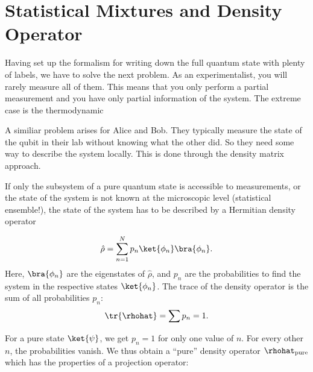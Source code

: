 \section{Statistical Mixtures and Density Operator}

Having set up the formalism for writing down the full quantum state with plenty of labels, we have to solve the next problem. As an experimentalist, you will rarely measure all of them. This means that you only perform a partial measurement and you have only partial information of the system. The extreme case is the thermodynamic 

A similiar problem arises for Alice and Bob. They typically measure the state of the qubit in their lab without knowing what the other did. So they need some way to describe the system locally. This is done through the density matrix approach.

If only the subsystem of a pure quantum state is accessible to measurements, or the state of the system is not known at the microscopic level (statistical ensemble!), the state of the system has to be described by a Hermitian density operator

\begin{align}
 \hat{\rho} = \sum_{n=1}^N p_n \ket{\phi_n}\bra{\phi_n}.
\end{align}
Here, $\bra{\phi_n}$ are the eigenstates of $\hat{\rho}$, and $p_n$ are the probabilities to find the system in the respective states $\ket{\phi_n}$. The trace of the density operator is the sum of all probabilities $p_n$:
\begin{align}
  \tr{\rhohat} = \sum p_n = 1.
\end{align}

For a pure state $\ket{\psi}$, we get $p_n=1$ for only one value of $n$. For every other $n$, the probabilities vanish. We thus obtain a ``pure'' density operator $\rhohat_{\text{pure}}$ which has the properties of a projection operator:

